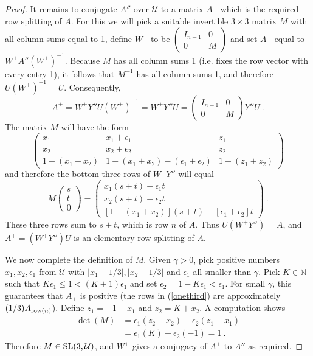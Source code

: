 \documentclass{amsart}
\theoremstyle{definition}
\theoremstyle{remark}
\numberwithin{equation}{section}
\begin{document}
{{\begin{proof}
It remains to conjugate $A''$ over $\mathcal U$ to a 
matrix 
$A^+$ which is the required row splitting of $A$. 
 For this we will pick a suitable invertible 
 $3\times 3$ matrix $M$ with all column sums equal to 1, define  
$W^+$ to be $\begin{pmatrix} I_{n-1} & 0 \\ 0 &M\end{pmatrix}$ 
and set $A^+$ equal to $W^+ A''(W^+)^{-1} $. 
Because $M$ has all column sums 1 (i.e. fixes the row vector with 
every entry 1), it follows that $M^{-1}$ has all column sums 1, and therefore 
$U(W^+)^{-1}=U$. Consequently, 
\[
A^+  =  W^+ Y''U(W^+)^{-1}  =  W^+ Y''U
= 
\begin{pmatrix} I_{n-1} & 0   \\  0 & M 
\end{pmatrix} Y''
U  \ . 
\]
The matrix $M$ will have the form 
\begin{equation}\label{Mdefn}
\begin{pmatrix} 
x_1 & x_1 + \epsilon_1 & z_1 \\
x_2 & x_2 + \epsilon_2 & z_2 \\
1-(x_1+x_2) & 1-(x_1+x_2)-(\epsilon_1+\epsilon_2) & 1-(z_1+z_2)
\end{pmatrix} 
\end{equation}
and therefore the bottom three rows of $W^+Y''$ will equal 
\begin{equation}\label{onethird}
M 
\begin{pmatrix} s \\ t\\ 0 
\end{pmatrix} 
= 
\begin{pmatrix} 
x_1(s+t) + \epsilon_1t \\ 
x_2(s+t) + \epsilon_2t \\ 
[1- (x_1+x_2)](s+t) - [\epsilon_1+\epsilon_2]t  
\end{pmatrix} \ . 
\end{equation}  
These three rows  sum to $s+t$, 
which is row $n$ of $A$. Thus $U(W^+Y'')=A$, and 
$A^+=(W^+Y'')U$ is an elementary 
row splitting of $A$. 

We now complete the definition of $M$. 
Given $\gamma>0$, pick positive numbers $x_1, x_2, \epsilon_1$ from 
$\mathcal U$ with $|x_1-1/3|, |x_2 - 1/3|$ and $\epsilon_1$ all smaller 
than $\gamma$.  Pick $K\in \mathbb N$ 
such that $K\epsilon_1 \leq 1< (K+1)\epsilon_1$ and set $\epsilon_2= 1-K\epsilon_1
< \epsilon_1$. For small $\gamma$, this guarantees that $A_+$ is positive 
(the rows in (\ref{onethird}) are approximately 
$(1/3)A_{\textnormal{row}(n)}$).   
 Define $z_1 = -1+x_1$ and $z_2 = K+x_2$. 
A computation shows 
\begin{align*}  
\det(M) &= \epsilon_1(z_2-x_2) - \epsilon_2 (z_1-x_1) \\ 
&= \epsilon_1(K) - \epsilon_2(-1) = 1 \ . 
\end{align*} 
Therefore $M\in \textnormal{SL}(3,\mathcal U)$, and $W^+$ gives a conjugacy of 
$A^+$ to $A''$ as required. 


\end{proof}}}
\end{document}
